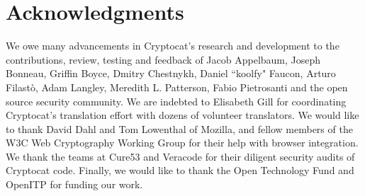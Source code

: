 \documentclass[letterpaper,twocolumn,10pt]{article}
\begin{document}
\section{Acknowledgments}

We owe many advancements in Cryptocat's research and development to the contributions, review, testing and feedback of Jacob Appelbaum, Joseph Bonneau, Griffin Boyce, Dmitry Chestnykh, Daniel ``koolfy" Faucon, Arturo Filast\`{o}, Adam Langley, Meredith L. Patterson, Fabio Pietrosanti and the open source security community. We are indebted to Elisabeth Gill for coordinating Cryptocat's translation effort with dozens of volunteer translators. We would like to thank David Dahl and Tom Lowenthal of Mozilla, and fellow members of the W3C Web Cryptography Working Group for their help with browser integration. We thank the teams at Cure53 and Veracode for their diligent security audits of Cryptocat code. Finally, we would like to thank the Open Technology Fund \cite{otf} and OpenITP \cite{openitp} for funding our work.
\end{document}
